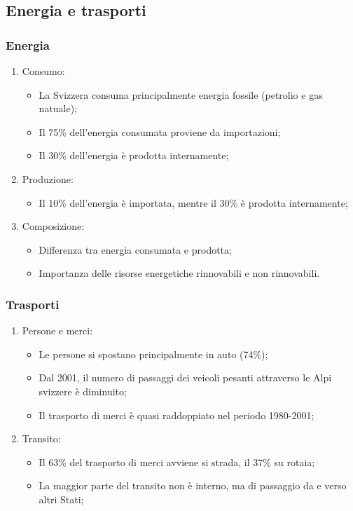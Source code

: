\documentclass{article}
\begin{document}
\subsection{Energia e trasporti}

\subsubsection{Energia}
\begin{enumerate}
    \item Consumo:
        \begin{itemize}
            \item La Svizzera consuma principalmente energia fossile (petrolio e gas natuale);
            \item Il 75\% dell'energia consumata proviene da importazioni;
            \item Il 30\% dell'energia è prodotta internamente;
        \end{itemize}
    \item Produzione:
        \begin{itemize}
            \item Il 10\% dell'energia è importata, mentre il 30\% è prodotta internamente;
        \end{itemize}
    \item Composizione:
        \begin{itemize}
            \item Differenza tra energia consumata e prodotta;
            \item Importanza delle risorse energetiche rinnovabili e non rinnovabili.
        \end{itemize}
\end{enumerate}

\subsubsection{Trasporti}
\begin{enumerate}
    \item Persone e merci:
        \begin{itemize}
            \item Le persone si spostano principalmente in auto (74\%);
            \item Dal 2001, il numero di passaggi dei veicoli pesanti attraverso le Alpi
                svizzere è diminuito;
            \item Il trasporto di merci è quasi raddoppiato nel periodo 1980-2001;
        \end{itemize}
    \item Transito:
        \begin{itemize}
            \item Il 63\% del trasporto di merci avviene si strada, il 37\% su rotaia;
            \item La maggior parte del transito non è interno, ma di passaggio da e verso altri
                Stati;
        \end{itemize}
\end{enumerate}
\end{document}
